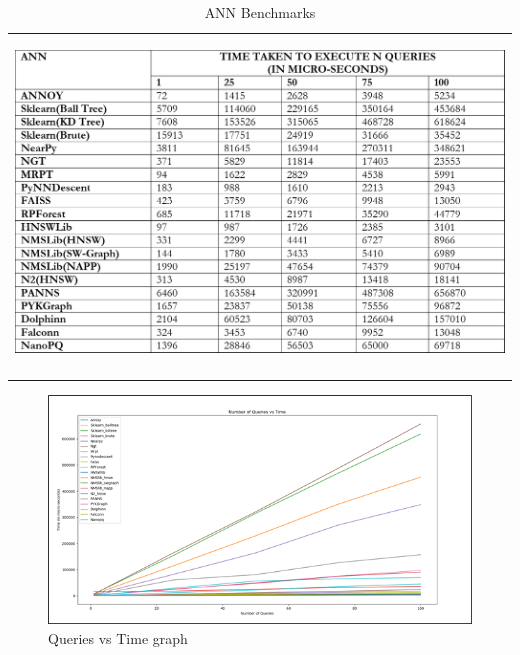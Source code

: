 \documentclass[12pt]{article}
\renewcommand{\_}{\kern-1.5pt\textunderscore\kern-1.5pt}
\begin{document}


\begin{table}[H]
 			\centering
\begin{tabular}{p{6.07in}}
\hline
\multicolumn{1}{|p{6.07in}|}{
	\begin{Center}
		\includegraphics[scale=0.25]{./media/image11.png}
	\end{Center}
} \\
\hhline{-}

\end{tabular}\caption{ANN Benchmarks}
\label{tab:ANN Benchmarks}

 \end{table}



\setlength{\parskip}{0.0pt}
\begin{FlushLeft}

\end{FlushLeft}\par


\vspace{\baselineskip}
\setlength{\parskip}{12.0pt}



\begin{figure}[H]
	\begin{FlushLeft}		\includegraphics[scale=0.75]{./media/image5.png}
		\caption{Queries vs Time graph}
		\label{fig:Queries_vs_Time_graph}
	\end{FlushLeft}\end{figure}
\end{document}
